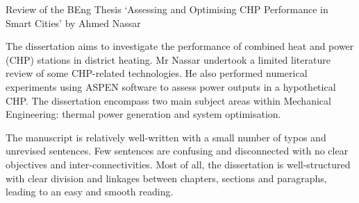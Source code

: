 \documentclass[14pt,twoside]{report}
\begin{document}
\clearpage




\bigskip

\begin{center}
  {\Large Review of the BEng Thesis `Assessing and Optimising CHP Performance in Smart Cities' by Ahmed Nassar}
\end{center}
The dissertation aims to investigate the performance of combined heat and power (CHP) stations in district heating. Mr Nassar undertook a limited literature review of some CHP-related technologies. He also performed numerical experiments using ASPEN software to assess power outputs in a hypothetical CHP. The dissertation encompass two main subject areas within Mechanical Engineering: thermal power generation and system optimisation.

The manuscript is relatively well-written with a small number of typos and unrevised sentences. Few sentences are confusing and disconnected with no clear objectives and inter-connectivities. Most of all, the dissertation is well-structured with clear division and linkages between chapters, sections and paragraphs, leading to an easy and smooth reading.
\end{document}

